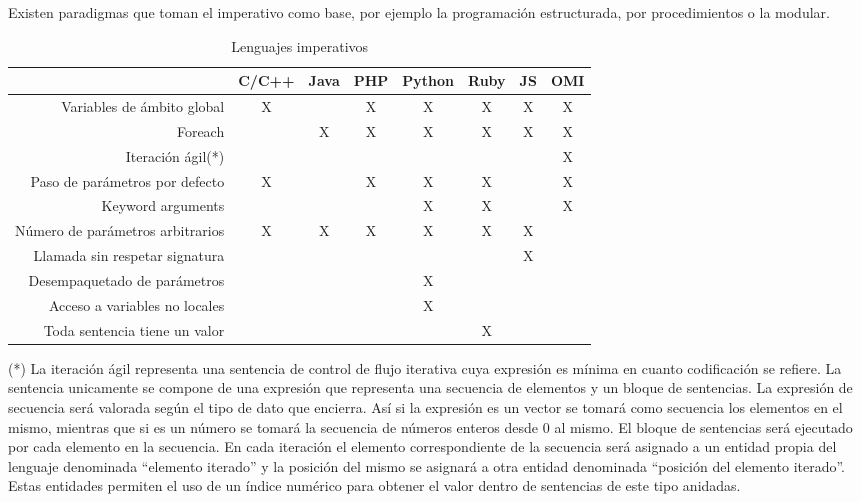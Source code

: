 Existen paradigmas que toman el imperativo como base, por ejemplo la programación
estructurada, por procedimientos o la modular. 


\FloatBarrier
\begin{table}[h]
\begin{center}
 
\begin{tabular}{|r|c|c|c|c|c|c|c|} \hline
 & C/C++ & Java &  PHP  & Python & Ruby & JS & OMI\\ \hline
Variables de ámbito global  & X &  & X & X & X & X & X \\ \hline
Foreach & & X & X & X & X & X & X \\ \hline
Iteración ágil(*) & &  & &  &  &  & X \\ \hline
Paso de parámetros por defecto & X &  & X & X & X & & X  \\ \hline
Keyword arguments & & &  & X & X & & X  \\ \hline
Número de parámetros arbitrarios & X & X & X & X & X & X &   \\ \hline
Llamada sin respetar signatura  &  &  &  &  &  & X &   \\ \hline
Desempaquetado de parámetros & & & & X & & &  \\ \hline
Acceso a variables no locales & & & & X & & &  \\ \hline
Toda sentencia tiene un valor & & & & & X & &  \\ \hline
\end{tabular}
\caption{Lenguajes imperativos}
\end{center}
\end{table}
\FloatBarrier

(*) La iteración ágil representa una sentencia de control de flujo iterativa 
cuya expresión es mínima en cuanto codificación se refiere. La 
sentencia unicamente se compone de una expresión que representa una secuencia de elementos
y un bloque de sentencias. La expresión de secuencia será valorada según el tipo de dato
que encierra. Así si la expresión es un vector se tomará como 
secuencia los elementos en el mismo, mientras que si es un número se 
tomará la secuencia de números enteros desde 0 al mismo. El bloque de 
sentencias será ejecutado por cada elemento en la secuencia. En cada iteración 
el elemento correspondiente de la secuencia será asignado a un entidad propia del 
lenguaje denominada ``elemento iterado'' y la posición del mismo se asignará a 
otra entidad denominada ``posición del elemento iterado''. Estas entidades permiten el uso 
de un índice numérico para obtener el valor dentro de sentencias de este tipo anidadas. 

